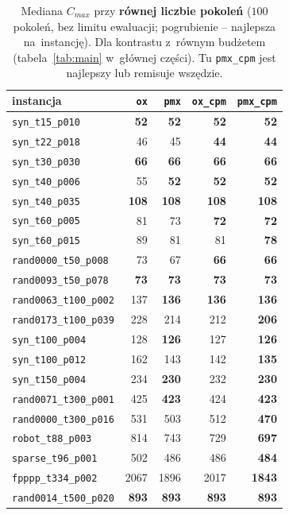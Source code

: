 \documentclass[pdflatex,sn-mathphys,Numbered]{sn-jnl}
\begin{document}
\begin{table}[ht]
\centering\scriptsize\setlength{\tabcolsep}{4pt}
\begin{tabular}{lrrrr}
\toprule
instancja & \texttt{ox} & \texttt{pmx} & \texttt{ox\_cpm} & \texttt{pmx\_cpm} \\
\midrule
\texttt{syn\_t15\_p010} & \textbf{52} & \textbf{52} & \textbf{52} & \textbf{52} \\
\texttt{syn\_t22\_p018} & 46 & 45 & \textbf{44} & \textbf{44} \\
\texttt{syn\_t30\_p030} & \textbf{66} & \textbf{66} & \textbf{66} & \textbf{66} \\
\texttt{syn\_t40\_p006} & 55 & \textbf{52} & \textbf{52} & \textbf{52} \\
\texttt{syn\_t40\_p035} & \textbf{108} & \textbf{108} & \textbf{108} & \textbf{108} \\
\texttt{syn\_t60\_p005} & 81 & 73 & \textbf{72} & \textbf{72} \\
\texttt{syn\_t60\_p015} & 89 & 81 & 81 & \textbf{78} \\
\texttt{rand0000\_t50\_p008} & 73 & 67 & \textbf{66} & \textbf{66} \\
\texttt{rand0093\_t50\_p078} & \textbf{73} & \textbf{73} & \textbf{73} & \textbf{73} \\
\texttt{rand0063\_t100\_p002} & 137 & \textbf{136} & \textbf{136} & \textbf{136} \\
\texttt{rand0173\_t100\_p039} & 228 & 214 & 212 & \textbf{206} \\
\texttt{syn\_t100\_p004} & 128 & \textbf{126} & 127 & \textbf{126} \\
\texttt{syn\_t100\_p012} & 162 & 143 & 142 & \textbf{135} \\
\texttt{syn\_t150\_p004} & 234 & \textbf{230} & 232 & \textbf{230} \\
\texttt{rand0071\_t300\_p001} & 425 & \textbf{423} & 424 & \textbf{423} \\
\texttt{rand0000\_t300\_p016} & 531 & 503 & 512 & \textbf{470} \\
\texttt{robot\_t88\_p003} & 814 & 743 & 729 & \textbf{697} \\
\texttt{sparse\_t96\_p001} & 502 & 486 & 486 & \textbf{484} \\
\texttt{fpppp\_t334\_p002} & 2067 & 1896 & 2017 & \textbf{1843} \\
\texttt{rand0014\_t500\_p020} & \textbf{893} & \textbf{893} & \textbf{893} & \textbf{893} \\
\bottomrule
\end{tabular}
\caption{Mediana $C_{max}$ przy \textbf{równej liczbie pokoleń} ($100$ pokoleń, bez
limitu ewaluacji; pogrubienie -- najlepsza na~instancję). Dla kontrastu z~równym
budżetem (tabela~\ref{tab:main} w~głównej części). Tu \texttt{pmx\_cpm} jest
najlepszy lub remisuje wszędzie.}
\label{tab:gen-main}
\end{table}
\end{document}
